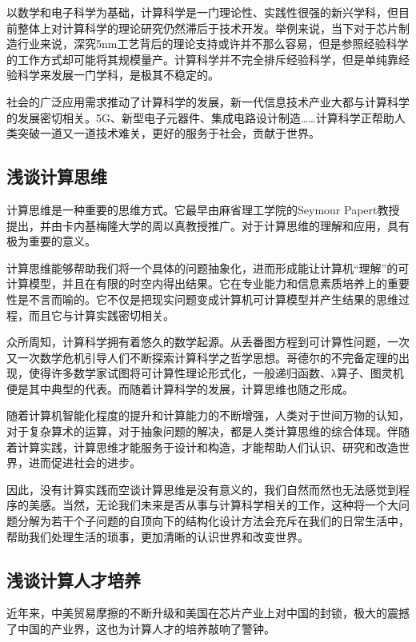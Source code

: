 \documentclass{article}
\begin{document}
以数学和电子科学为基础，计算科学是一门理论性、实践性很强的新兴学科，但目前整体上对计算科学的理论研究仍然滞后于技术开发。举例来说，当下对于芯片制造行业来说，深究5nm工艺背后的理论支持或许并不那么容易，但是参照经验科学的工作方式却可能将其规模量产。计算科学并不完全排斥经验科学，但是单纯靠经验科学来发展一门学科，是极其不稳定的。

社会的广泛应用需求推动了计算科学的发展，新一代信息技术产业大都与计算科学的发展密切相关。5G、新型电子元器件、集成电路设计制造……计算科学正帮助人类突破一道又一道技术难关，更好的服务于社会，贡献于世界。

\subsection{浅谈计算思维}

计算思维是一种重要的思维方式\cite{ref1}。它最早由麻省理工学院的Seymour Papert教授提出\cite{ref2}，并由卡内基梅隆大学的周以真教授推广\cite{ref3}。对于计算思维的理解和应用，具有极为重要的意义。

计算思维能够帮助我们将一个具体的问题抽象化，进而形成能让计算机“理解”的可计算模型，并且在有限的时空内得出结果。它在专业能力和信息素质培养上的重要性是不言而喻的。它不仅是把现实问题变成计算机可计算模型并产生结果的思维过程，而且它与计算实践密切相关。

众所周知，计算科学拥有着悠久的数学起源。从丢番图方程到可计算性问题，一次又一次数学危机引导人们不断探索计算科学之哲学思想。哥德尔的不完备定理的出现，使得许多数学家试图将可计算性理论形式化，一般递归函数、λ算子、图灵机便是其中典型的代表。而随着计算科学的发展，计算思维也随之形成。

随着计算机智能化程度的提升和计算能力的不断增强，人类对于世间万物的认知，对于复杂算术的运算，对于抽象问题的解决，都是人类计算思维的综合体现。伴随着计算实践，计算思维才能服务于设计和构造，才能帮助人们认识、研究和改造世界，进而促进社会的进步。

因此，没有计算实践而空谈计算思维是没有意义的，我们自然而然也无法感觉到程序的美感。当然，无论我们未来是否从事与计算科学相关的工作，这种将一个大问题分解为若干个子问题的自顶向下的结构化设计方法会充斥在我们的日常生活中，帮助我们处理生活的琐事，更加清晰的认识世界和改变世界。

\subsection{浅谈计算人才培养}

近年来，中美贸易摩擦的不断升级和美国在芯片产业上对中国的封锁，极大的震撼了中国的产业界，这也为计算人才的培养敲响了警钟。
\end{document}
